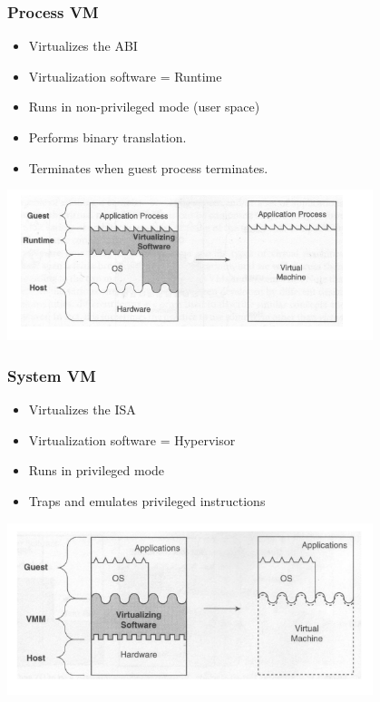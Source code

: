 \documentclass[12pt]{article}
\begin{document}
\subsubsection{Process VM}
\begin{itemize}
    \item Virtualizes the ABI
    \item Virtualization software = Runtime
    \item Runs in non-privileged mode (user space)
    \item Performs binary translation.
    \item Terminates when guest process terminates.
\end{itemize}
\includegraphics[width=0.8\textwidth]{ProcessVM.png}
\subsubsection{System VM}
\begin{itemize}
    \item Virtualizes the ISA
    \item Virtualization software = Hypervisor
    \item Runs in privileged mode 
    \item Traps and emulates privileged instructions
\end{itemize}
\includegraphics[width=0.8\textwidth]{SystemVM.png}
\end{document}
